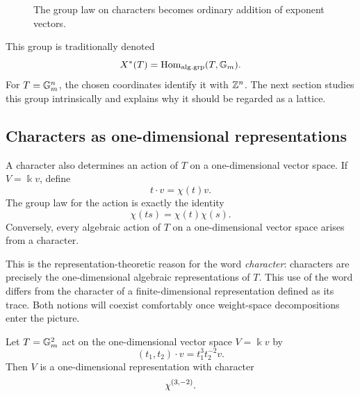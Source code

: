 \begin{figure}[ht]
\centering
{}
\caption{The group law on characters becomes ordinary addition of
exponent vectors.}
\label{fig:add-exponents-multiply-characters}
\end{figure}

This group is traditionally denoted
\[
X^*(T)
=
\operatorname{Hom}_{\mathrm{alg.grp}}(T,\mathbb{G}_{m}).
\]
For \(T=\mathbb{G}_{m}^n\), the chosen coordinates identify it with \(\mathbb{Z}^n\).
The next section studies this group intrinsically and explains why it
should be regarded as a lattice.

\subsection{Characters as one-dimensional representations}

A character also determines an action of \(T\) on a one-dimensional
vector space. If \(V=\Bbbk v\), define
\[
t\cdot v=\chi(t)v.
\]
The group law for the action is exactly the identity
\[
\chi(ts)=\chi(t)\chi(s).
\]
Conversely, every algebraic action of \(T\) on a one-dimensional
vector space arises from a character.

\begin{observation}
This is the representation-theoretic reason for the word
\emph{character}: characters are precisely the one-dimensional
algebraic representations of \(T\). This use of the word differs from
the character of a finite-dimensional representation defined as its
trace. Both notions will coexist comfortably once weight-space
decompositions enter the picture.
\end{observation}

\begin{example}
Let \(T=\mathbb{G}_{m}^2\) act on the one-dimensional vector space
\(V=\Bbbk v\) by
\[
(t_1,t_2)\cdot v=t_1^3t_2^{-2}v.
\]
Then \(V\) is a one-dimensional representation with character
\[
\chi^{(3,-2)}.
\]
\end{example}

